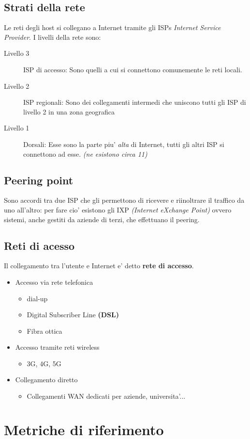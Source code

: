 \subsection{Strati della rete}
Le reti degli host si collegano a Internet tramite gli ISPs \textit{Internet Service Provider}.
I livelli della rete sono:
\begin{description}
    \item[Livello 3] ISP di accesso: Sono quelli a cui si connettono comunemente le reti locali.
    \item[Livello 2] ISP regionali: Sono dei collegamenti intermedi che uniscono tutti gli ISP di livello 2 in una zona geografica
    \item[Livello 1] Dorsali: Esse sono la parte piu' \textit{alta} di Internet, tutti gli altri ISP si connettono ad esse. \textit{(ne esistono circa 11)}
\end{description}

\subsection{Peering point}
Sono accordi tra due ISP che gli permettono di ricevere e riinoltrare il traffico da uno all'altro:
per fare cio' esistono gli IXP \textit{(Internet eXchange Point)} ovvero sistemi, anche gestiti da aziende di terzi, che effettuano il peering.
\subsection{Reti di acesso}
Il collegamento tra l'utente e Internet e' detto \textbf{rete di accesso}.
\begin{itemize}
    \item Accesso via rete telefonica
    \begin{itemize}
        \item dial-up
        \item Digital Subscriber Line \textbf{(DSL)}
        \item Fibra ottica
    \end{itemize}
    \item Accesso tramite reti wireless
    \begin{itemize}
        \item 3G, 4G, 5G
    \end{itemize}
    \item Collegamento diretto
    \begin{itemize}
        \item Collegamenti WAN dedicati per aziende, universita'...
    \end{itemize}
\end{itemize}

\section{Metriche di riferimento}